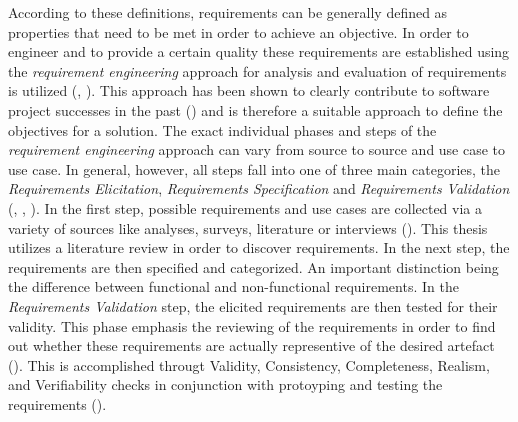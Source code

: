 According to these definitions, requirements can be generally defined as properties that need to be met in order to achieve an objective. In order to engineer and to provide a certain quality these requirements are established using the \textit{requirement engineering} approach for analysis and evaluation of requirements is utilized (\cite{SWEBOK.2004}, \cite{Sommerville.2011}). This approach has been shown to clearly contribute to software project successes in the past (\cite{Hofmann.2001}) and is therefore a suitable approach to define the objectives for a solution. The exact individual phases and steps of the \textit{requirement engineering} approach can vary from source to source and use case to use case. In general, however, all steps fall into one of three main categories, the \textit{Requirements Elicitation}, \textit{Requirements Specification} and \textit{Requirements Validation} (\cite{SWEBOK.2004}, \cite{Sommerville.2011}, \cite{Fernandes.2009}). In the first step, possible requirements and use cases are collected via a variety of sources like analyses, surveys, literature or interviews (\cite{Sommerville.2011}). This thesis utilizes a literature review in order to discover requirements. In the next step, the requirements are then specified and categorized. An important distinction being the difference between functional and non-functional requirements. In the \textit{Requirements Validation} step, the elicited requirements are then tested for their validity. This phase emphasis the reviewing of the requirements in order to find out whether these requirements are actually representive of the desired artefact (\cite{Sommerville.2011}). This is accomplished througt Validity, Consistency, Completeness, Realism, and Verifiability checks in conjunction with protoyping and testing the requirements (\cite{Sommerville.2011}).








